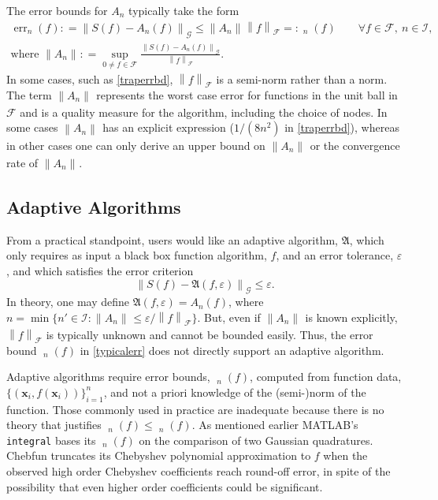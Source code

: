 \documentclass[11pt]{NSFamsart}
\DeclareMathOperator{\err}{err}
\DeclareMathOperator{\oerr}{\overline{\err}}
\DeclareMathOperator{\herr}{\widehat{\err}}
\newcommand{\bx}{{\boldsymbol{x}}}
\newcommand{\calf}{{\mathcal{F}}}
\newcommand{\calI}{{\mathcal{I}}}
\newcommand{\calg}{{\mathcal{G}}}
\newcommand{\fA}{\mathfrak{A}}
\newcommand{\norm}[2][{}]{\ensuremath{\left \lVert #2 \right \rVert}_{#1}}
\begin{document}
The error bounds  for $A_n$ typically take the  form
\begin{gather} \label{typicalerr}
\err_n(f): = \norm[\calg]{S(f) - A_n(f)} \le \norm{A_n} \norm[\calf]{f} =: \oerr_n(f) \qquad \forall f \in 
\calf, \ n \in 
\calI, 
\\ \text{where }\norm{A_n}  : = \sup_{0 \ne f \in \calf} \frac{\norm[\calg]{S(f) - A_n(f)}} 
{\norm[\calf]{f}}.
\end{gather} 
In some cases, such as  \eqref{traperrbd}, $\norm[\calf]{f}$ is a 
semi-norm rather than a norm.  The term $\norm{A_n}$
represents the worst case error for functions in the unit ball in $\calf$ and is a quality measure for 
the algorithm, including the
choice of nodes.  In some cases 
$\norm{A_n}$ has an explicit expression ($1/(8n^2)$ in \eqref{traperrbd}), whereas in other 
cases one 
can only derive an upper bound on $\norm{A_n}$ or the convergence rate of 
$\norm{A_n}$. 

\subsection{Adaptive Algorithms} From a practical standpoint, users would like an adaptive 
algorithm, 
$\fA$, which only requires as input a black box function algorithm, $f$, and an error tolerance, 
$\varepsilon$, and which satisfies the error criterion
\begin{equation} \label{errorcrit} \tag{CRIT}
\norm[\calg]{S(f) - \fA(f,\varepsilon)} \le \varepsilon.
\end{equation}
In theory, one may define $\fA(f,\varepsilon) = A_n(f)$, where $n = \min \{ n' \in \calI : \norm{A_n} \le 
\varepsilon / 
\norm[\calf]{f}\}$.  But, even if $\norm{A_n}$ is known explicitly, $\norm[\calf]{f}$ is 
typically 
unknown and cannot be 
bounded easily.  Thus, the error bound $\oerr_n(f)$ in \eqref{typicalerr} does not directly support an 
adaptive algorithm.

Adaptive algorithms require error bounds, $\herr_n(f)$, computed from function data, 
$\{(\bx_i,f(\bx_i))\}_{i=1}^n$, and not a priori knowledge of the (semi-)norm of the function.  Those 
commonly used in practice are inadequate because there is no theory that justifies
$\oerr_n(f)  \le \herr_n(f)$.  As mentioned earlier MATLAB's \texttt{integral} bases its $\herr_n(f)$ on 
the comparison of two Gaussian quadratures.  Chebfun truncates its Chebyshev polynomial 
approximation to $f$ when the observed high order Chebyshev coefficients reach round-off 
error, in spite of the possibility that even higher order coefficients could be significant.
\end{document}

